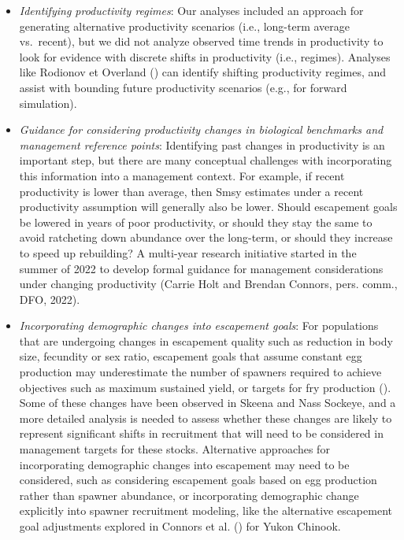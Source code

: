 \documentclass[french,11pt]{book}
\begin{document}
\begin{itemize}

\item
  \emph{Identifying productivity regimes}: Our analyses included an approach for generating alternative productivity scenarios (i.e., long-term average vs.~recent), but we did not analyze observed time trends in productivity to look for evidence with discrete shifts in productivity (i.e., regimes). Analyses like Rodionov et Overland () can identify shifting productivity regimes, and assist with bounding future productivity scenarios (e.g., for forward simulation).
\item
  \emph{Guidance for considering productivity changes in biological benchmarks and management reference points}: Identifying past changes in productivity is an important step, but there are many conceptual challenges with incorporating this information into a management context. For example, if recent productivity is lower than average, then Smsy estimates under a recent productivity assumption will generally also be lower. Should escapement goals be lowered in years of poor productivity, or should they stay the same to avoid ratcheting down abundance over the long-term, or should they increase to speed up rebuilding? A multi-year research initiative started in the summer of 2022 to develop formal guidance for management considerations under changing productivity (Carrie Holt and Brendan Connors, pers. comm., DFO, 2022).
\item
  \emph{Incorporating demographic changes into escapement goals}: For populations that are undergoing changes in escapement quality such as reduction in body size, fecundity or sex ratio, escapement goals that assume constant egg production may underestimate the number of spawners required to achieve objectives such as maximum sustained yield, or targets for fry production (). Some of these changes have been observed in Skeena and Nass Sockeye, and a more detailed analysis is needed to assess whether these changes are likely to represent significant shifts in recruitment that will need to be considered in management targets for these stocks. Alternative approaches for incorporating demographic changes into escapement may need to be considered, such as considering escapement goals based on egg production rather than spawner abundance, or incorporating demographic change explicitly into spawner recruitment modeling, like the alternative escapement goal adjustments explored in Connors et al. () for Yukon Chinook.
\end{itemize}
\clearpage
\end{document}
